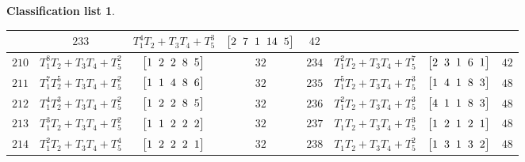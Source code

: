\documentclass[10pt,a4paper]{amsart}
\theoremstyle{definition}
\newtheorem{class-list}[thm]{Classification list}
\numberwithin{equation}{section}
\begin{document}
\begin{class-list}
\begin{table}[t!]
\begin{tabu}{c|c|c|c||c|c|c|c}
&${233}$&${T_{1}^{4}T_{2}+T_{3}T_{4}+T_{5}^{3}}$
&$\arraycolsep=1mm\begin{bmatrix}{2} & {7} & {1} & {14} & {5}\end{bmatrix}$&${42}$
\\ \hline
${210}$&${T_{1}^{8}T_{2}+T_{3}T_{4}+T_{5}^{2}}$
&$\arraycolsep=1mm\begin{bmatrix}{1} & {2} & {2} & {8} & {5}\end{bmatrix}$&${32}$
&${234}$&${T_{1}^{2}T_{2}+T_{3}T_{4}+T_{5}^{7}}$
&$\arraycolsep=1mm\begin{bmatrix}{2} & {3} & {1} & {6} & {1}\end{bmatrix}$&${42}$
\\ \hline
${211}$&${T_{1}^{7}T_{2}^{5}+T_{3}T_{4}+T_{5}^{2}}$
&$\arraycolsep=1mm\begin{bmatrix}{1} & {1} & {4} & {8} & {6}\end{bmatrix}$&${32}$
&${235}$&${T_{1}^{5}T_{2}+T_{3}T_{4}+T_{5}^{3}}$
&$\arraycolsep=1mm\begin{bmatrix}{1} & {4} & {1} & {8} & {3}\end{bmatrix}$&${48}$
\\ \hline
${212}$&${T_{1}^{4}T_{2}^{3}+T_{3}T_{4}+T_{5}^{2}}$
&$\arraycolsep=1mm\begin{bmatrix}{1} & {2} & {2} & {8} & {5}\end{bmatrix}$&${32}$
&${236}$&${T_{1}^{2}T_{2}+T_{3}T_{4}+T_{5}^{3}}$
&$\arraycolsep=1mm\begin{bmatrix}{4} & {1} & {1} & {8} & {3}\end{bmatrix}$&${48}$
\\
\hline
${213}$&${T_{1}^{3}T_{2}+T_{3}T_{4}+T_{5}^{2}}$
&$\arraycolsep=1mm\begin{bmatrix}{1} & {1} & {2} & {2} & {2}\end{bmatrix}$&${32}$
&${237}$&${T_{1}T_{2}+T_{3}T_{4}+T_{5}^{3}}$
&$\arraycolsep=1mm\begin{bmatrix}{1} & {2} & {1} & {2} & {1}\end{bmatrix}$&${48}$
\\
\hline
${214}$&${T_{1}^{2}T_{2}+T_{3}T_{4}+T_{5}^{4}}$
&$\arraycolsep=1mm\begin{bmatrix}{1} & {2} & {2} & {2} & {1}\end{bmatrix}$&${32}$
&${238}$&${T_{1}T_{2}+T_{3}T_{4}+T_{5}^{2}}$
&$\arraycolsep=1mm\begin{bmatrix}{1} & {3} & {1} & {3} & {2}\end{bmatrix}$&${48}$
\\

\end{tabu}
\end{table}
\end{class-list}
\end{document}
